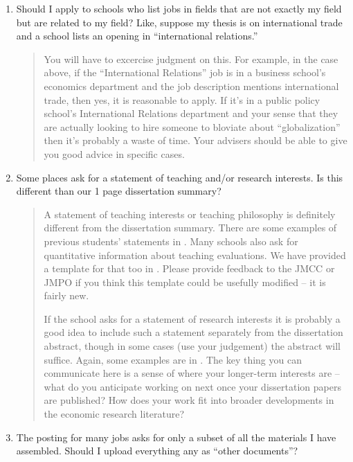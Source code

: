 \documentclass{\classes/econtex}
\providecommand\phantomsection{}
\begin{document}
\begin{enumerate}
\begin{quote}
    \end{quote}
  \item  Should I apply to schools who list jobs in fields that are not exactly my field but are related to my
    field?  Like, suppose my thesis is on international trade and a school lists
    an opening in ``international relations.''

    \begin{quote}
      You will have to excercise judgment on this.  For example, in the case
      above, if the ``International Relations'' job is in a business
      school's economics department and the job description mentions
      international trade, then yes, it is reasonable to apply.  If it's in
      a public policy school's International Relations department and your
      sense that they are actually looking to hire someone to bloviate about
      ``globalization'' then it's probably a waste of time.  Your advisers
      should be able to give you good advice in specific cases.

    \end{quote}
  \item  Some places ask for a statement of teaching and/or research
    interests.  Is this different than our 1 page
    dissertation summary?

    \begin{quote}
      A statement of teaching interests or teaching philosophy is
      definitely different from the dissertation summary.  There are some
      examples of previous students' statements in \Resources.  Many
      schools also ask for quantitative information about teaching
      evaluations.  We have provided a template for that too in
      \Templates.  Please provide feedback to the JMCC or JMPO if you
      think this template could be usefully modified -- it is fairly new.

      If the school asks for a statement of research interests it is probably
      a good idea to include such a statement separately from the dissertation
      abstract, though in some cases (use your judgement) the abstract will suffice.  Again, some examples are in \Resources.  
      The key thing you can communicate here is a sense of where your longer-term 
      interests are -- what do you anticipate working on next once your dissertation
      papers are published?  How does your work fit into broader developments in 
      the economic research literature?

      \ifdvi\phantomsection\hypertarget{PostOtherDocsQ}{}\fi
    \end{quote}
  \item  The {\JOE} posting for many jobs asks for only a subset of all the materials I have assembled.  Should I upload everything any as ``other documents''?


\end{enumerate}
\end{document}
